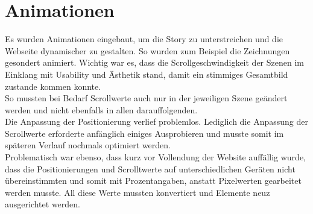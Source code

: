 \section{Animationen}
Es wurden Animationen eingebaut, um die Story zu unterstreichen und die Webseite dynamischer zu gestalten. So wurden zum Beispiel die Zeichnungen gesondert animiert.
Wichtig war es, dass die Scrollgeschwindigkeit der Szenen im Einklang mit Usability und Ästhetik stand, damit ein stimmiges Gesamtbild zustande kommen konnte. \\
So mussten bei Bedarf Scrollwerte auch nur in der jeweiligen Szene geändert werden und nicht ebenfalls in allen darauffolgenden. \\
Die Anpassung der Positionierung verlief problemlos. Lediglich die Anpassung der Scrollwerte erforderte anfänglich einiges Ausprobieren und musste somit im späteren Verlauf nochmals optimiert werden.\\
Problematisch war ebenso, dass kurz vor Vollendung der Website auffällig wurde, dass die Positionierungen und Scrolltwerte auf unterschiedlichen Geräten nicht übereinstimmten und somit mit Prozentangaben, anstatt Pixelwerten gearbeitet werden musste. All diese Werte mussten konvertiert und Elemente neuz ausgerichtet werden.